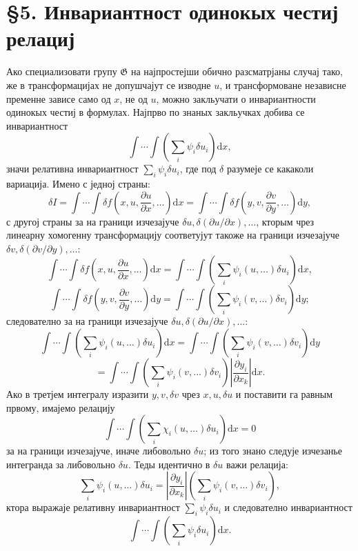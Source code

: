 ﻿\documentclass[11pt]{article}
\providecommand{\G}{\mathfrak G}
\providecommand{\p}{\partial}
\providecommand{\dd}{\mathrm d}
\begin{document}
\section*{\S{}5. Инвариантност одинокых честиј релациј}

Ако специализовати групу \(\G\) на најпростејши обично разсматрјаны случај тако, же в трансформацијах не допушчајут се изводне \(u\), и трансформоване независне пременне зависе само од \(x\), не од \(u\), можно закльучати о инвариантности одинокых честиј в формулах. Најпрво по знаных закльучках добива се инвариантност
\[
\int\!\cdots\!\int\left(\sum_i\psi_i\delta u_i\right)\dd x,
\]
значи релативна инвариантност \(\sum_i\psi_i\delta u_i\), где под \(\delta\) разумеје се какаколи вариација. Имено с једној страны:
\[
\delta I
=\int\!\cdots\!\int \delta f\!\left(x,u,\frac{\p u}{\p x},\ldots\right)\dd x
=\int\!\cdots\!\int \delta f\!\left(y,v,\frac{\p v}{\p y},\ldots\right)\dd y,
\]
с другој страны за на граници изчезајуче \(\delta u,\delta(\p u/\p x),\ldots\), кторым чрез линеарну хомогенну трансформацију соответујут такоже на граници изчезајуче \(\delta v,\delta(\p v/\p y),\ldots\):
\[
\int\!\cdots\!\int \delta f\!\left(x,u,\frac{\p u}{\p x},\ldots\right)\dd x
=
\int\!\cdots\!\int\left(\sum_i\psi_i(u,\ldots)\delta u_i\right)\dd x,
\]
\[
\int\!\cdots\!\int \delta f\!\left(y,v,\frac{\p v}{\p y},\ldots\right)\dd y
=
\int\!\cdots\!\int\left(\sum_i\psi_i(v,\ldots)\delta v_i\right)\dd y;
\]
следователно за на граници изчезајуче \(\delta u,\delta(\p u/\p x),\ldots\):
\[
\int\!\cdots\!\int\left(\sum_i\psi_i(u,\ldots)\delta u_i\right)\dd x
=
\int\!\cdots\!\int\left(\sum_i\psi_i(v,\ldots)\delta v_i\right)\dd y
\]
\[
=
\int\!\cdots\!\int\left(\sum_i\psi_i(v,\ldots)\delta v_i\right)
\left|\frac{\p y_i}{\p x_k}\right|\dd x.
\]
Ако в третјем интегралу изразити \(y,v,\delta v\) чрез \(x,u,\delta u\) и поставити га равным првому, имајемо релацију
\[
\int\!\cdots\!\int\left(\sum_i\chi_i(u,\ldots)\delta u_i\right)\dd x=0
\]
за на граници изчезајуче, иначе либовольно \(\delta u\); из того знано следује изчезанье интегранда за либовольно \(\delta u\). Теды идентично в \(\delta u\) важи релација:
\[
\sum_i\psi_i(u,\ldots)\delta u_i
=
\left|\frac{\p y_i}{\p x_k}\right|
\left(\sum_i\psi_i(v,\ldots)\delta v_i\right),
\]
ктора выражаје релативну инвариантност \(\sum_i\psi_i\delta u_i\) и следователно инвариантност
\[
\int\!\cdots\!\int\left(\sum_i\psi_i\delta u_i\right)\dd x.
\]
\end{document}
